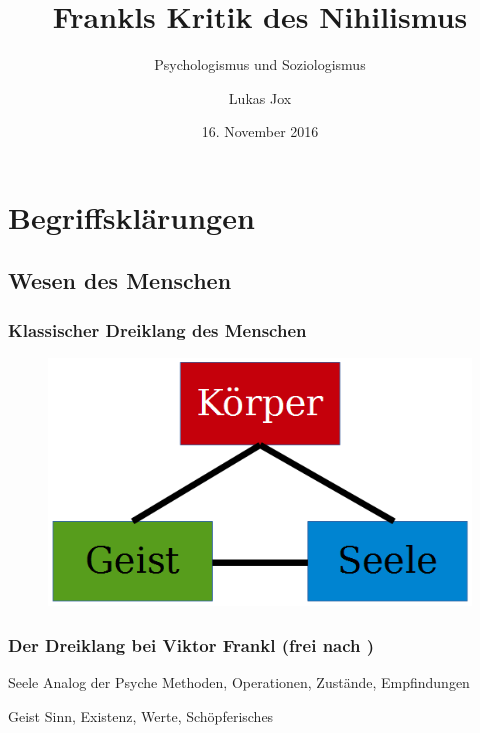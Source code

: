 \documentclass{beamer}
\title{Frankls Kritik des Nihilismus}
\subtitle{Psychologismus und Soziologismus}
\author{Lukas Jox}
\date{16. November 2016}
\institute
{Seminar: Der Wille zum Sinn \\ Humboldstudienzentrum für Philosophie und Geisteswissenschaften}
\begin{document}
\begin{frame}
\titlepage
\end{frame}

\begin{frame}
\tableofcontents
\end{frame}


\expandafter\def\expandafter\insertshorttitle\expandafter{%
  \insertshorttitle\hfill%
  \insertframenumber$\vert$\inserttotalframenumber}
  
\section{Begriffsklärungen}
\subsection{Wesen des Menschen}

\begin{frame}
\frametitle{Klassischer Dreiklang des Menschen}
\begin{figure}
\centering	
	\includegraphics[height=0.5\paperheight]{resources/dreiklang.png}
\end{figure}

\end{frame}


\begin{frame}
\frametitle{Der Dreiklang bei Viktor Frankl (frei nach \textcite{Frankl1996})}
\begin{block}{Seele}
Analog der Psyche Methoden, Operationen, Zustände, Empfindungen
\end{block}
\vspace{0,5cm}
\pause
\begin{block}{Geist}
Sinn, Existenz, Werte, Schöpferisches
\end{block}
\end{frame}
\end{document}
